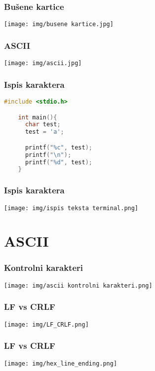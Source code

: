 \documentclass{beamer}
\begin{document}
\begin{frame}
  \frametitle{Bušene kartice}
  \begin{center}
    \texttt{[image: img/busene kartice.jpg]}
  \end{center}
\end{frame}

\begin{frame}
  \frametitle{ASCII}
  \begin{center}
    \texttt{[image: img/ascii.jpg]}
  \end{center}
\end{frame}

\begin{frame}[fragile]
  \frametitle{Ispis karaktera}
  \begin{lstlisting}[language=C]
    #include <stdio.h>

    int main(){
      char test;
      test = 'a';

      printf("%c", test);
      printf("\n");
      printf("%d", test);
    }
  \end{lstlisting}
\end{frame}

\begin{frame}
  \frametitle{Ispis karaktera}
  \begin{center}
    \texttt{[image: img/ispis teksta terminal.png]}
  \end{center}
\end{frame}

\section*{ASCII}
\begin{frame}
  \frametitle{Kontrolni karakteri}
  \begin{center}
    \texttt{[image: img/ascii kontrolni karakteri.png]}
  \end{center}
\end{frame}

\begin{frame}
  \frametitle{LF vs CRLF}
  \begin{center}
    \texttt{[image: img/LF\_CRLF.png]}
  \end{center}
\end{frame}

\begin{frame}
  \frametitle{LF vs CRLF}
  \begin{center}
    \texttt{[image: img/hex\_line\_ending.png]}
  \end{center}
\end{frame}
\end{document}
